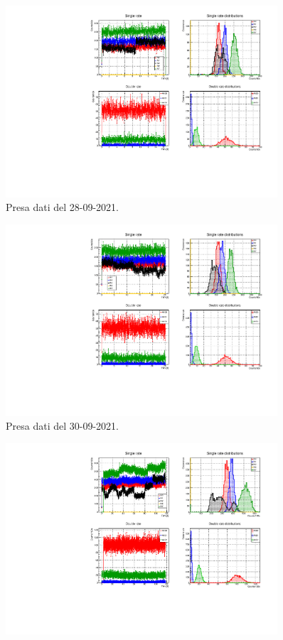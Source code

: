 \documentclass[11pt,a4paper]{article}
\begin{document}
\begin{figure}
\includegraphics[width=0.9\textwidth]{Immagini/20210928.pdf}
\caption{Presa dati del 28-09-2021.}
\end{figure}  \begin{figure}
\includegraphics[width=0.9\textwidth]{Immagini/20210930.pdf}
\caption{Presa dati del 30-09-2021.}
\end{figure}  \begin{figure}
\includegraphics[width=0.9\textwidth]{Immagini/20211005.pdf}

\end{figure}
\end{document}
